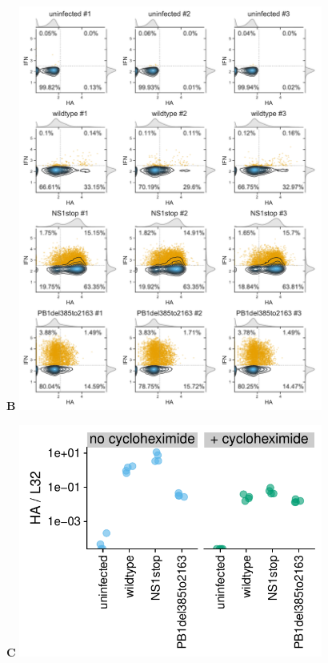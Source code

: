 \documentclass[10pt,letterpaper]{article}
\begin{document}
\begin{suppfig}
\begin{minipage}[t]{0.46\textwidth}
\end{minipage}
\hspace{0.02\textwidth}
\begin{minipage}[t]{0.5\textwidth}
{\bf \Large B}
\includegraphics[width=0.75\textwidth, valign=t]{figures/Validation_Figure/del_flow_plot.pdf}
\vspace{0.1in}

{\bf \Large C}
\includegraphics[width=0.75\textwidth, valign=t]{figures/Validation_Figure/qpcr_plot.pdf}


\end{minipage}
\end{suppfig}
\end{document}

